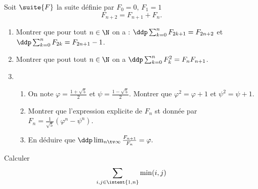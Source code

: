 \documentclass[a4paper, 11pt,reqno]{article}
\begin{document}
\begin{exercice}
Soit $\suite{F}$ la suite définie par $F_0 =0, \, F_1=1 $  
$$ F_{n+2} = F_{n+1} +F_n.$$

\begin{enumerate}
\item Montrer que pour tout $n\in \N$ on a : $\ddp \sum_{k=0}^n F_{2k+1} =F_{2n+2}$
et $\ddp \sum_{k=0}^n F_{2k} =F_{2n+1}-1$.
\item Montrer que pout tout $n\in \N$ on a $\ddp \sum_{k=0}^n F_{k}^2 =F_nF_{n+1}$.
\item \begin{enumerate}
\item On note $\varphi = \frac{1+\sqrt{5}}{2}$ et $\psi=\frac{1-\sqrt{5}}{2}$. Montrer que 
$\varphi^2 =\varphi+1$ et $\psi^2 =\psi+1$.
\item Montrer que l'expression explicite de $F_n$ st donnée par $F_n =\frac{1}{\sqrt{5}}(\varphi^n-\psi^n)$.
\item En déduire que $\ddp \lim_{n\tv \infty} \frac{F_{n+1}}{F_n}=\varphi.$
\end{enumerate}
\end{enumerate}

\end{exercice}


\begin{exercice}
Calculer 
$$\sum_{i,j \in \intent{1,n}} \min(i,j)$$

\end{exercice}
\end{document}
